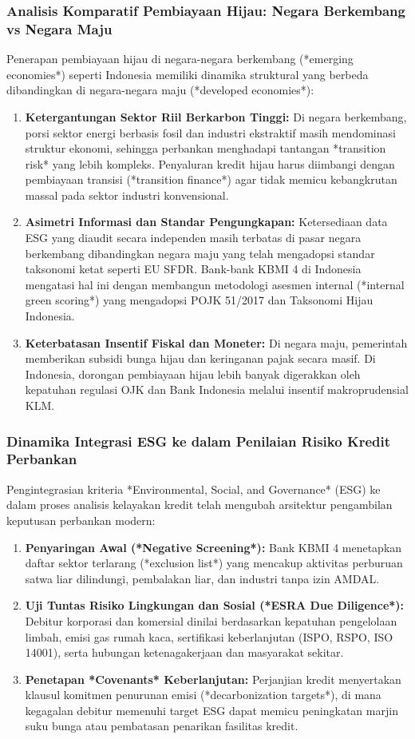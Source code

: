 \documentclass[12pt,a4paper]{article}
\numberwithin{equation}{section}
\begin{document}
\subsubsection{Analisis Komparatif Pembiayaan Hijau: Negara Berkembang vs Negara Maju}
\noindent
Penerapan pembiayaan hijau di negara-negara berkembang (*emerging economies*) seperti Indonesia memiliki dinamika struktural yang berbeda dibandingkan di negara-negara maju (*developed economies*):
\begin{enumerate}
  \item \textbf{Ketergantungan Sektor Riil Berkarbon Tinggi:} Di negara berkembang, porsi sektor energi berbasis fosil dan industri ekstraktif masih mendominasi struktur ekonomi, sehingga perbankan menghadapi tantangan *transition risk* yang lebih kompleks. Penyaluran kredit hijau harus diimbangi dengan pembiayaan transisi (*transition finance*) agar tidak memicu kebangkrutan massal pada sektor industri konvensional.
  \item \textbf{Asimetri Informasi dan Standar Pengungkapan:} Ketersediaan data ESG yang diaudit secara independen masih terbatas di pasar negara berkembang dibandingkan negara maju yang telah mengadopsi standar taksonomi ketat seperti EU SFDR. Bank-bank KBMI 4 di Indonesia mengatasi hal ini dengan membangun metodologi asesmen internal (*internal green scoring*) yang mengadopsi POJK 51/2017 dan Taksonomi Hijau Indonesia.
  \item \textbf{Keterbatasan Insentif Fiskal dan Moneter:} Di negara maju, pemerintah memberikan subsidi bunga hijau dan keringanan pajak secara masif. Di Indonesia, dorongan pembiayaan hijau lebih banyak digerakkan oleh kepatuhan regulasi OJK dan Bank Indonesia melalui insentif makroprudensial KLM.
\end{enumerate}

\subsubsection{Dinamika Integrasi ESG ke dalam Penilaian Risiko Kredit Perbankan}
\noindent
Pengintegrasian kriteria *Environmental, Social, and Governance* (ESG) ke dalam proses analisis kelayakan kredit telah mengubah arsitektur pengambilan keputusan perbankan modern:
\begin{enumerate}
  \item \textbf{Penyaringan Awal (*Negative Screening*):} Bank KBMI 4 menetapkan daftar sektor terlarang (*exclusion list*) yang mencakup aktivitas perburuan satwa liar dilindungi, pembalakan liar, dan industri tanpa izin AMDAL.
  \item \textbf{Uji Tuntas Risiko Lingkungan dan Sosial (*ESRA Due Diligence*):} Debitur korporasi dan komersial dinilai berdasarkan kepatuhan pengelolaan limbah, emisi gas rumah kaca, sertifikasi keberlanjutan (ISPO, RSPO, ISO 14001), serta hubungan ketenagakerjaan dan masyarakat sekitar.
  \item \textbf{Penetapan *Covenants* Keberlanjutan:} Perjanjian kredit menyertakan klausul komitmen penurunan emisi (*decarbonization targets*), di mana kegagalan debitur memenuhi target ESG dapat memicu peningkatan marjin suku bunga atau pembatasan penarikan fasilitas kredit.
\end{enumerate}
\end{document}
